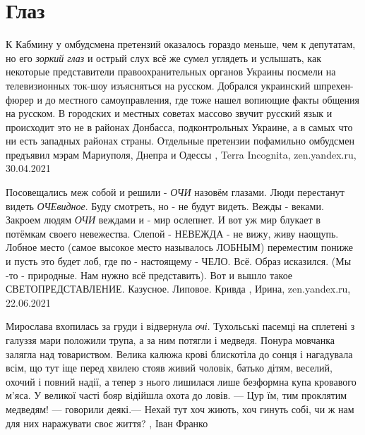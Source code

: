  
 
 
 
 
\chapter{Глаз}
\label{sec:slova.glaz}

К Кабмину у омбудсмена претензий оказалось гораздо меньше, чем к депутатам, но
его \emph{зоркий глаз} и острый слух всё же сумел углядеть и услышать, как некоторые
представители правоохранительных органов Украины посмели на телевизионных
ток-шоу изъясняться на русском.  Добрался украинский шпрехен-фюрер и до
местного самоуправления, где тоже нашел вопиющие факты общения на русском. В
городских и местных советах массово звучит русский язык и происходит это не в
районах Донбасса, подконтрольных Украине, а в самых что ни есть западных
районах страны. Отдельные претензии пофамильно омбудсмен предъявил мэрам
Мариуполя, Днепра и Одессы
, 
Terra Incognita, zen.yandex.ru, 30.04.2021

Посовещались меж собой и решили - \emph{ОЧИ} назовём глазами. Люди перестанут видеть
\emph{ОЧЕвидное}. Буду смотреть, но - не будут видеть. Вежды - веками. Закроем людям
\emph{ОЧИ} веждами и - мир ослепнет. И вот уж мир блукает в потёмкам своего
невежества. Слепой - НЕВЕЖДА - не вижу, живу наощупь.  Лобное место (самое
высокое место называлось ЛОБНЫМ) переместим пониже и пусть это будет лоб, где
по - настоящему - ЧЕЛО. Всё. Образ исказился.  (Мы -то - природные. Нам нужно
всё представить). Вот и вышло такое СВЕТОПРЕДСТАВЛЕНИЕ. Казусное. Липовое.
Кривда 
, 
Ирина, zen.yandex.ru, 22.06.2021

Мирослава вхопилась за груди і відвернула \emph{очі}. Тухольські пасемці на сплетені з
галуззя мари положили трупа, а за ним потягли і медведя. Понура мовчанка
залягла над товариством. Велика калюжа крові блискотіла до сонця і нагадувала
всім, що тут іще перед хвилею стояв живий чоловік, батько дітям, веселий,
охочий і повний надії, а тепер з нього лишилася лише безформна купа кровавого
м'яса. У великої часті бояр відійшла охота до ловів.  — Цур їм, тим проклятим
медведям! — говорили деякі.— Нехай тут хоч жиють, хоч гинуть собі, чи ж нам для
них наражувати своє життя?
, Іван Франко
